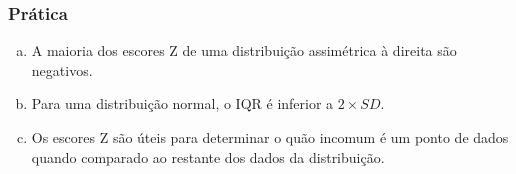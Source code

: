 
\begin{frame}
\frametitle{Prática}
\justifying
{}

\begin{enumerate}[(a)]
\justifying
\item A maioria dos escores Z de uma distribuição assimétrica à direita são negativos.
\justifying
{}
\justifying
\item Para uma distribuição normal, o IQR é inferior a $2 \times SD$.
\justifying
\item Os escores Z são úteis para determinar o quão incomum é um ponto de dados quando comparado ao restante dos dados da distribuição.
\end{enumerate}

\end{frame}


